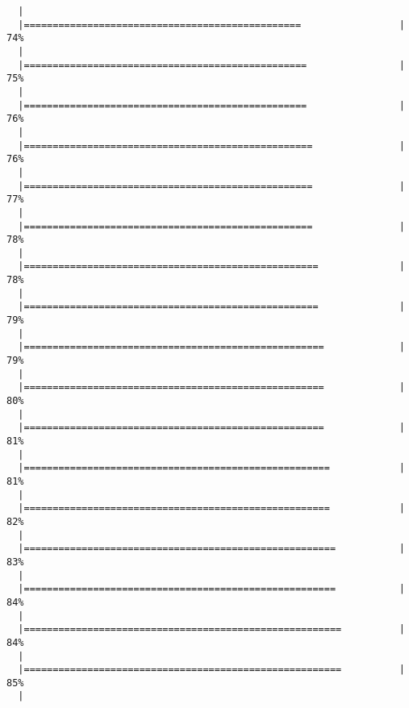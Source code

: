 \begin{knitrout}
\begin{kframe}
\begin{verbatim}
  |                                                                       
  |================================================                 |  74%
  |                                                                       
  |=================================================                |  75%
  |                                                                       
  |=================================================                |  76%
  |                                                                       
  |==================================================               |  76%
  |                                                                       
  |==================================================               |  77%
  |                                                                       
  |==================================================               |  78%
  |                                                                       
  |===================================================              |  78%
  |                                                                       
  |===================================================              |  79%
  |                                                                       
  |====================================================             |  79%
  |                                                                       
  |====================================================             |  80%
  |                                                                       
  |====================================================             |  81%
  |                                                                       
  |=====================================================            |  81%
  |                                                                       
  |=====================================================            |  82%
  |                                                                       
  |======================================================           |  83%
  |                                                                       
  |======================================================           |  84%
  |                                                                       
  |=======================================================          |  84%
  |                                                                       
  |=======================================================          |  85%
  |                                                                       

\end{verbatim}
\end{kframe}
\end{knitrout}
